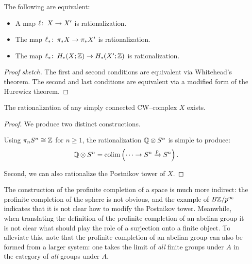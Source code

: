 \begin{lemma}
The following are equivalent:
\begin{itemize}
    \item A map $\ell\colon\thinspace X \to X'$ is rationalization.
    \item The map $\ell_* \colon\thinspace \pi_* X \to \pi_* X'$ is rationalization.
    \item The map $\ell_* \colon\thinspace H_*(X; \mathbb Z) \to H_*(X'; \mathbb Z)$ is rationalization.
\end{itemize}
\end{lemma}
\begin{proof}[Proof sketch]
The first and second conditions are equivalent via Whitehead's theorem.
The second and last conditions are equivalent via a modified form of the Hurewicz theorem.
\end{proof}

\begin{theorem}
The rationalization of any simply connected CW--complex $X$ exists.
\marginnote{}
\end{theorem}
\begin{proof}
We produce two distinct constructions.

Using $\pi_n S^n \cong \mathbb Z$ for $n \ge 1$, the rationalization $\mathbb Q \otimes S^n$ is simple to produce: \[\mathbb Q \otimes S^n = \operatorname{colim} \left( \cdots \to S^n \xrightarrow{p} S^n \right).\]

Second, we can also rationalize the Postnikov tower of $X$.
\end{proof}

The construction of the profinite completion of a space is much more indirect: the profinite completion of the sphere is not obvious, and the example of $B\mathbb Z/p^\infty$ indicates that it is not clear how to modify the Postnikov tower.
Meanwhile, when translating the definition of the profinite completion of an abelian group it is not clear what should play the role of a surjection onto a finite object.
To alleviate this, note that the profinite completion of an abelian group can also be formed from a larger system: one takes the limit of \emph{all} finite groups under $A$ in the category of \emph{all} groups under $A$.

